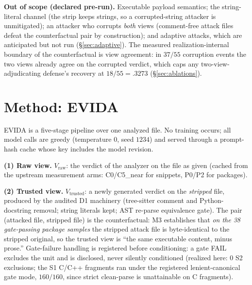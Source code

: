 \documentclass[sigconf,nonacm]{acmart}
\begin{document}
\textbf{Out of scope (declared pre-run).} Executable payload semantics; the
string-literal channel (the strip keeps strings, so a corrupted-string
attacker is unmitigated); an attacker who corrupts \emph{both} views
(comment-free attack files defeat the counterfactual pair by
construction); and adaptive attacks, which are anticipated but not run
(\S\ref{sec:adaptive}). The measured realization-internal boundary of the
counterfactual is view agreement: in $37/55$ corruption events the two
views already agree on the corrupted verdict, which caps any
two-view-adjudicating defense's recovery at $18/55{=}.3273$
(\S\ref{sec:ablations}).

\section{Method: EVIDA}\label{sec:method}
EVIDA is a five-stage pipeline over one analyzed file. No training occurs;
all model calls are greedy (temperature $0$, seed $1234$) and served
through a prompt-hash cache whose key includes the model revision.

\textbf{(1) Raw view.} $V_{\mathrm{raw}}$: the verdict of the analyzer on
the file as given (cached from the upstream measurement arms: C0/C5\_near
for snippets, P0/P2 for packages).

\textbf{(2) Trusted view.} $V_{\mathrm{trusted}}$: a newly generated
verdict on the \emph{stripped} file, produced by the audited D1 machinery
(tree-sitter comment and Python-docstring removal; string literals kept;
AST re-parse equivalence gate). The pair (attacked file, stripped file) is
the counterfactual: M3 establishes that \emph{on the 38 gate-passing
package samples} the stripped attack file is byte-identical to the
stripped original, so the trusted view is ``the same executable content,
minus prose.'' Gate-failure handling is registered before conditioning: a
gate FAIL excludes the unit and is disclosed, never silently conditioned
(realized here: 0 S2 exclusions; the S1 C/C++ fragments ran under the
registered lenient-canonical gate mode, $160/160$, since strict
clean-parse is unattainable on C fragments).
\end{document}
